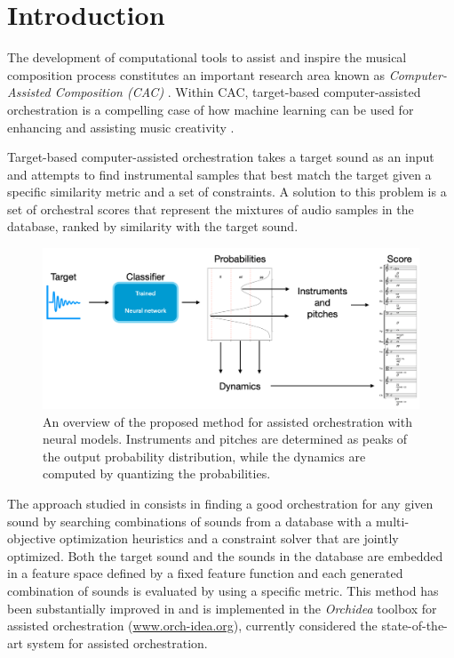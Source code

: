 \documentclass[runningheads,a4paper]{llncs}
\begin{document}
\section{Introduction}\label{sec:introduction}

The development of computational tools to assist and inspire the musical composition process constitutes an important research area known as \emph{Computer-Assisted Composition (CAC)} \cite{FerVic2013, Ari2005}. Within CAC, target-based computer-assisted orchestration is a compelling case of how machine learning can be used for {enhancing} and {assisting} music creativity \cite{Maresz2003}. 

Target-based computer-assisted orchestration takes a target sound as an input and attempts to find instrumental samples that best match the target given a specific similarity metric and a set of constraints. A solution to this problem is a set of orchestral scores that represent the mixtures of audio samples in the database, ranked by similarity with the target sound. 



\begin{figure}
	\centering
	\includegraphics[scale=0.20]{../latex/figs/method.png}
	\caption{An overview of the proposed method for assisted orchestration with neural models. Instruments and pitches are determined as peaks of the output probability distribution, while the dynamics are computed by quantizing the probabilities. \label{fig:method}}
\end{figure}

The approach studied in \cite{Carpentier2010} consists in finding a good orchestration for any given sound by searching combinations of sounds from a database with a multi-objective optimization heuristics and a constraint solver that are jointly optimized. Both the target sound and the sounds in the database are embedded in a feature space defined by a fixed feature function and each generated combination of sounds is evaluated by using a specific metric. This method has been substantially improved in \cite{Cella18, Cella2020} and is implemented in the \emph{Orchidea} toolbox for assisted orchestration (\url{www.orch-idea.org}), currently considered the state-of-the-art system for assisted orchestration.
\end{document}
